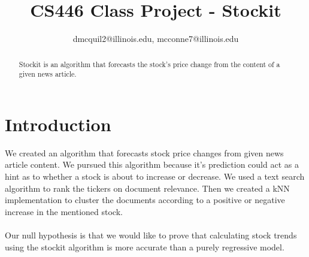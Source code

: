 \documentclass[11pt,letterpaper]{article}
\newcommand{\blue}[1]{\textcolor{RoyalBlue}{#1}}
\newcommand{\instructions}[1]{\blue{\textit{#1}}}
\begin{document}
\title{CS446 Class Project - Stockit}
\author{dmcquil2@illinois.edu, mcconne7@illinois.edu}
\maketitle




\begin{abstract}
Stockit is an algorithm that forecasts the stock's price change from the content of a given news article.
\end{abstract}

\section{Introduction}
\label{sec:introduction}
We created an algorithm that forecasts stock price changes from given news article content.
We pursued this algorithm because it's prediction could act as a hint as to
whether a stock is about to increase or decrease. We used a
text search algorithm to rank the tickers on document relevance. Then we created
a kNN implementation to cluster the documents according to a positive or negative increase in the mentioned stock. \\  \\
Our null hypothesis is that we would like to prove that calculating stock
trends using the stockit algorithm is more accurate than a purely regressive model.
\end{document}
